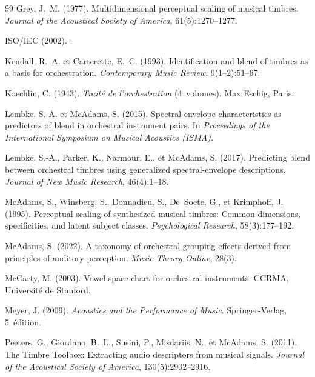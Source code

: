 \documentclass[12pt,a4paper]{article}
\begin{document}
\begin{thebibliography}{99}
Grey, J.~M. (1977).
\newblock Multidimensional perceptual scaling of musical timbres.
\newblock \emph{Journal of the Acoustical Society of America}, 61(5):1270--1277.

{ISO/IEC} (2002).
.

Kendall, R.~A. et Carterette, E.~C. (1993).
\newblock Identification and blend of timbres as a basis for orchestration.
\newblock \emph{Contemporary Music Review}, 9(1--2):51--67.

Koechlin, C. (1943).
\newblock \emph{Trait\'e de l'orchestration} (4~volumes).
\newblock Max Eschig, Paris.

Lembke, S.-A. et McAdams, S. (2015).
\newblock Spectral-envelope characteristics as predictors of blend in
  orchestral instrument pairs.
\newblock In \emph{Proceedings of the International Symposium on Musical
  Acoustics (ISMA)}.

Lembke, S.-A., Parker, K., Narmour, E., et McAdams, S. (2017).
\newblock Predicting blend between orchestral timbres using generalized
  spectral-envelope descriptions.
\newblock \emph{Journal of New Music Research}, 46(4):1--18.

McAdams, S., Winsberg, S., Donnadieu, S., De~Soete, G., et Krimphoff, J.
  (1995).
\newblock Perceptual scaling of synthesized musical timbres: Common dimensions,
  specificities, and latent subject classes.
\newblock \emph{Psychological Research}, 58(3):177--192.

McAdams, S. (2022).
\newblock A taxonomy of orchestral grouping effects derived from principles of
  auditory perception.
\newblock \emph{Music Theory Online}, 28(3).

McCarty, M. (2003).
\newblock Vowel space chart for orchestral instruments.
\newblock CCRMA, Université de Stanford.

Meyer, J. (2009).
\newblock \emph{Acoustics and the Performance of Music}.
\newblock Springer-Verlag, 5\ieme~édition.

Peeters, G., Giordano, B.~L., Susini, P., Misdariis, N., et McAdams, S.
  (2011).
\newblock The {T}imbre {T}oolbox: Extracting audio descriptors from musical
  signals.
\newblock \emph{Journal of the Acoustical Society of America},
  130(5):2902--2916.


\end{thebibliography}
\end{document}
